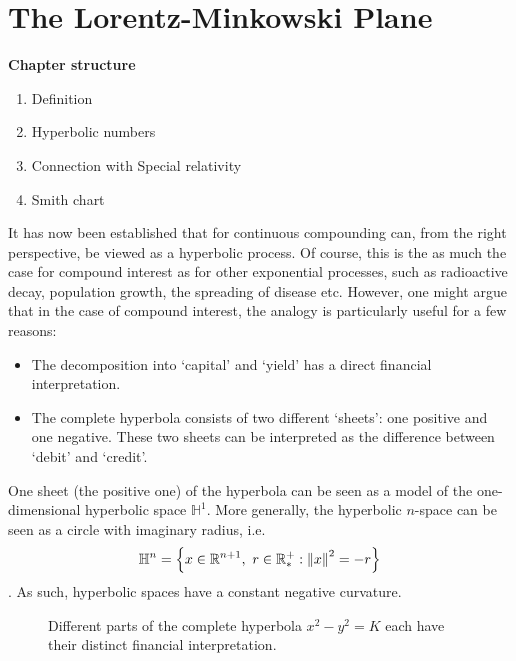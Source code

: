 \chapter{The Lorentz-Minkowski Plane}

\begin{framed}
    \textbf{Chapter structure}
    \begin{enumerate}
        \item Definition
        \item Hyperbolic numbers
        \item Connection with Special relativity
        \item Smith chart
    \end{enumerate}
\end{framed}

It has now been established that for continuous compounding can, from the right perspective, be viewed as a hyperbolic process. Of course, this is the as much the case for compound interest as for other exponential processes, such as radioactive decay, population growth, the spreading of disease etc. However, one might argue that in the case of compound interest, the analogy is particularly useful for a few reasons:
\begin{itemize}
    \item The decomposition into `capital' and `yield' has a direct financial interpretation.
    \item The complete hyperbola consists of two different `sheets': one positive and one negative. These two sheets can be interpreted as the difference between `debit' and `credit'.
\end{itemize}
One sheet (the positive one) of the hyperbola can be seen as a model of the one-dimensional hyperbolic space $\mathbb{H}^1$. More generally, the hyperbolic $n$-space can be seen as a circle with imaginary radius, i.e. $$\mathbb{H}^n = \qty{
x \in \mathbb{R}^{n+1},\ r \in \mathbb{R}^{+}_{*} : \norm{x}^2 = -r}$$. As such, hyperbolic spaces have a constant negative curvature.

\begin{figure}
    \centering
    \label{fig:credit_debit}
    \caption{Different parts of the complete hyperbola $x^2  - y^2 = K$ each have their distinct financial interpretation.}
\end{figure}
